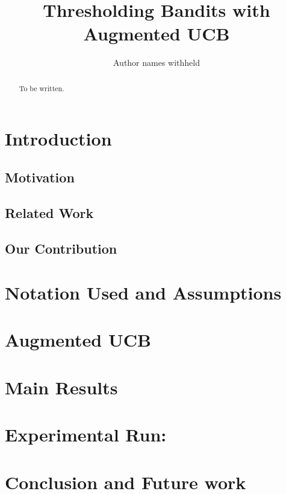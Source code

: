 \documentclass{article}
\title{Thresholding Bandits with Augmented UCB}
\author{Author names withheld}
\begin{document}
\maketitle

\begin{abstract}
To be written.
\end{abstract}


\section{Introduction}
\label{intro}


\subsection{Motivation}
\label{motivation}


\subsection{Related Work}
\label{prevRes}


\subsection{Our Contribution}
\label{contribution}


\section{Notation Used and Assumptions}
\label{notation}



\section{Augmented UCB}
\label{algo}


\section{Main Results}
\label{results}



\section{Experimental Run:}
\label{expt}



\section{Conclusion and Future work}
\label{conclusion}






%
\end{document}
